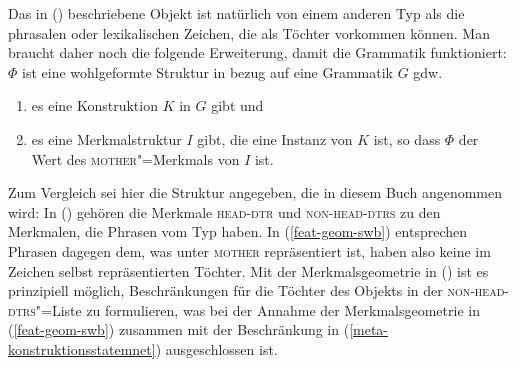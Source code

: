 \z
Das in () beschriebene Objekt ist natürlich von einem anderen Typ
als die phrasalen oder lexikalischen Zeichen, die als Töchter vorkommen können. Man braucht daher
noch die folgende Erweiterung, damit die Grammatik funktioniert:
\ea
\label{meta-konstruktionsstatemnet}
$\Phi$ ist eine wohlgeformte Struktur in bezug auf eine Grammatik $G$ gdw.\
\begin{enumerate}
\item es eine Konstruktion $K$ in $G$ gibt und
\item es eine Merkmalstruktur $I$ gibt, die eine Instanz von $K$ ist, so dass
      $\Phi$ der Wert des \textsc{mother}"=Merkmals von $I$ ist.
\end{enumerate}
\z
Zum Vergleich sei hier die Struktur angegeben, die in diesem Buch angenommen wird:
\ea
{}
\z
In () gehören die Merkmale \textsc{head-dtr} und \textsc{non-head-dtrs} zu den Merkmalen, die
\zb Phrasen vom Typ \type{head"=argument"=phrase} haben. In (\ref{feat-geom-swb}) entsprechen
Phrasen dagegen dem, was unter \textsc{mother} repräsentiert ist, haben also keine im Zeichen selbst
repräsentierten Töchter. Mit der Merkmalsgeometrie in (\mex{0}) ist es prinzipiell möglich,
Beschränkungen für die Töchter des Objekts in der \textsc{non-head-dtrs}"=Liste zu formulieren, was bei
der Annahme der Merkmalsgeometrie in (\ref{feat-geom-swb}) zusammen mit der Beschränkung in
(\ref{meta-konstruktionsstatemnet}) ausgeschlossen ist. 

